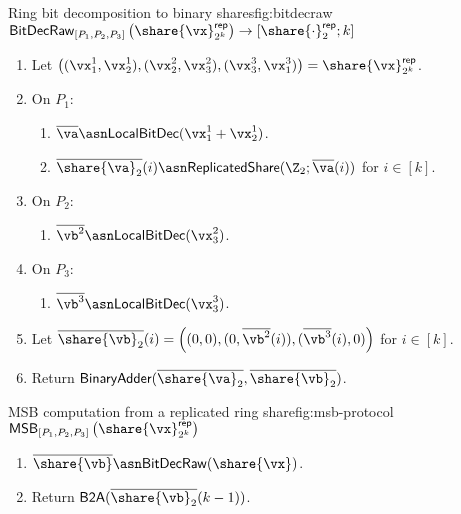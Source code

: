 

\begin{Boxfig}{Ring bit decomposition to binary shares}{fig:bitdecraw}
  {$\mathsf{BitDecRaw}_{[P_1, P_2, P_3]} \left( \share{\vx}^\mathsf{rep}_{2^k} \right) \rightarrow [\share{\cdot}^\mathsf{rep}_2; k]$}
  \begin{enumerate}
  \item Let $\left( (\vx_1^1, \vx_2^1), (\vx_2^2, \vx_3^2), (\vx_3^3, \vx_1^3) \right) = \share{\vx}^{\mathsf{rep}}_{2^k}$.

  \item On $P_1$:
  \begin{enumerate}
    \item $\overline{\va} \asn \textsf{LocalBitDec}(\vx^1_1 + \vx^1_2)$.
    \item $\overline{\share{\va}_2}(i) \asn \mathsf{ReplicatedShare}(\Z_2; \overline{\va}(i))$ for $i \in [k]$.
  \end{enumerate}

  \item On $P_2$:
  \begin{enumerate}
      \item $\overline{\vb^2} \asn \textsf{LocalBitDec}(\vx_3^2)$.
  \end{enumerate}

  \item On $P_3$:
  \begin{enumerate}
      \item $\overline{\vb^3} \asn \textsf{LocalBitDec}(\vx_3^3)$.
  \end{enumerate}
  \item Let $\overline{\share{\vb}_2}(i) = \left( (0, 0), (0, \overline{\vb^2}(i)), (\overline{\vb^3}(i), 0) \right)$ for $i \in [k]$.
  \item Return $\textsf{BinaryAdder}(\overline{\share{\va}_2}, \overline{\share{\vb}_2})$.
\end{enumerate}

\end{Boxfig}


\begin{Boxfig}{MSB computation from a replicated ring share}{fig:msb-protocol}
  {$\mathsf{MSB}_{[P_1, P_2, P_3]} \left( \share{\vx}^\mathsf{rep}_{2^k} \right)$}
  \begin{enumerate}
  \item $\overline{\share{\vb}} \asn \mathsf{BitDecRaw}(\share{\vx})$.
  \item Return $\textsf{B2A}(\overline{\share{\vb}_2}(k-1))$.
  \end{enumerate}

\end{Boxfig}

